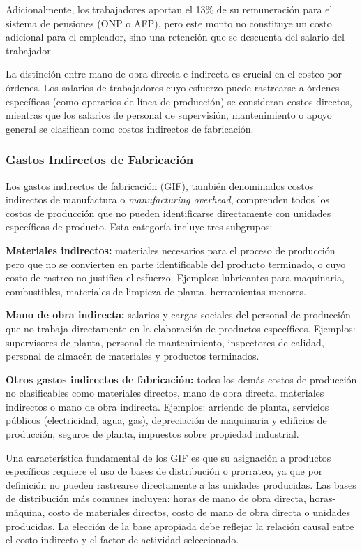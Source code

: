 \documentclass[
  stu,
  floatsintext,
  longtable,
  a4paper,
  nolmodern,
  notxfonts,
  notimes,
  12pt,
  colorlinks=true,linkcolor=blue,citecolor=blue,urlcolor=blue]{apa7}
\begin{document}
Adicionalmente, los trabajadores aportan el 13\% de su remuneración para
el sistema de pensiones (ONP o AFP), pero este monto no constituye un
costo adicional para el empleador, sino una retención que se descuenta
del salario del trabajador.

La distinción entre mano de obra directa e indirecta es crucial en el
costeo por órdenes. Los salarios de trabajadores cuyo esfuerzo puede
rastrearse a órdenes específicas (como operarios de línea de producción)
se consideran costos directos, mientras que los salarios de personal de
supervisión, mantenimiento o apoyo general se clasifican como costos
indirectos de fabricación.

\subsubsection{Gastos Indirectos de
Fabricación}\label{gastos-indirectos-de-fabricaciuxf3n}

Los gastos indirectos de fabricación (GIF), también denominados costos
indirectos de manufactura o \emph{manufacturing overhead}, comprenden
todos los costos de producción que no pueden identificarse directamente
con unidades específicas de producto. Esta categoría incluye tres
subgrupos:

\textbf{Materiales indirectos:} materiales necesarios para el proceso de
producción pero que no se convierten en parte identificable del producto
terminado, o cuyo costo de rastreo no justifica el esfuerzo. Ejemplos:
lubricantes para maquinaria, combustibles, materiales de limpieza de
planta, herramientas menores.

\textbf{Mano de obra indirecta:} salarios y cargas sociales del personal
de producción que no trabaja directamente en la elaboración de productos
específicos. Ejemplos: supervisores de planta, personal de
mantenimiento, inspectores de calidad, personal de almacén de materiales
y productos terminados.

\textbf{Otros gastos indirectos de fabricación:} todos los demás costos
de producción no clasificables como materiales directos, mano de obra
directa, materiales indirectos o mano de obra indirecta. Ejemplos:
arriendo de planta, servicios públicos (electricidad, agua, gas),
depreciación de maquinaria y edificios de producción, seguros de planta,
impuestos sobre propiedad industrial.

Una característica fundamental de los GIF es que su asignación a
productos específicos requiere el uso de bases de distribución o
prorrateo, ya que por definición no pueden rastrearse directamente a las
unidades producidas. Las bases de distribución más comunes incluyen:
horas de mano de obra directa, horas-máquina, costo de materiales
directos, costo de mano de obra directa o unidades producidas. La
elección de la base apropiada debe reflejar la relación causal entre el
costo indirecto y el factor de actividad seleccionado.
\end{document}
